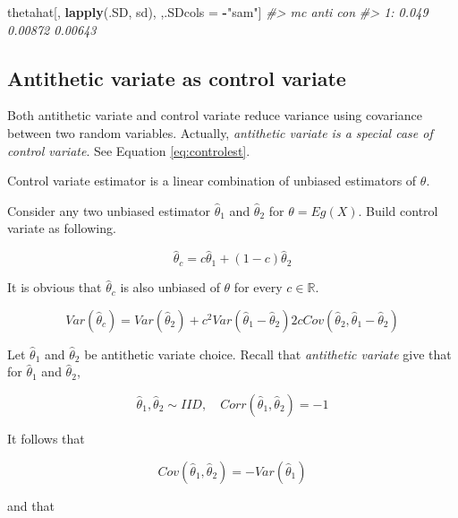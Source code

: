 \documentclass[]{book}
\newenvironment{Shaded}{\begin{snugshade}}{\end{snugshade}}
\newcommand{\CommentTok}[1]{\textcolor[rgb]{0.56,0.35,0.01}{\textit{#1}}}
\newcommand{\KeywordTok}[1]{\textcolor[rgb]{0.13,0.29,0.53}{\textbf{#1}}}
\newcommand{\NormalTok}[1]{#1}
\newcommand{\OperatorTok}[1]{\textcolor[rgb]{0.81,0.36,0.00}{\textbf{#1}}}
\newcommand{\StringTok}[1]{\textcolor[rgb]{0.31,0.60,0.02}{#1}}
\theoremstyle{definition}
\theoremstyle{definition}
\theoremstyle{definition}
\theoremstyle{remark}
\let\BeginKnitrBlock\begin \let\EndKnitrBlock\end
\begin{document}
\begin{Shaded}
\begin{Highlighting}[]
\NormalTok{thetahat[,}
         \KeywordTok{lapply}\NormalTok{(.SD, sd),}
\NormalTok{         ,.SDcols =}\StringTok{ }\OperatorTok{-}\StringTok{"sam"}\NormalTok{]}
\CommentTok{#>       mc    anti     con}
\CommentTok{#> 1: 0.049 0.00872 0.00643}
\end{Highlighting}
\end{Shaded}

\hypertarget{antithetic-variate-as-control-variate}{%
\subsection{Antithetic variate as control variate}\label{antithetic-variate-as-control-variate}}

Both antithetic variate and control variate reduce variance using covariance between two random variables. Actually, \emph{antithetic variate is a special case of control variate}. See Equation \eqref{eq:controlest}.

\BeginKnitrBlock{lemma}
\protect\hypertarget{lem:unnamed-chunk-65}{}{\label{lem:unnamed-chunk-65} }Control variate estimator is a linear combination of unbiased estimators of \(\theta\).
\EndKnitrBlock{lemma}

Consider any two unbiased estimator \(\hat\theta_1\) and \(\hat\theta_2\) for \(\theta = Eg(X)\). Build control variate as following.

\[\hat\theta_c = c\hat\theta_1 + (1 - c)\hat\theta_2\]

It is obvious that \(\hat\theta_c\) is also unbiased of \(\theta\) for every \(c \in \mathbb{R}\).

\begin{equation}
  Var(\hat\theta_c) = Var(\hat\theta_2) + c^2 Var(\hat\theta_1 - \hat\theta_2) 2c Cov(\hat\theta_2, \hat\theta_1 - \hat\theta_2)
  \label{eq:controlvar2}
\end{equation}

Let \(\hat\theta_1\) and \(\hat\theta_2\) be antithetic variate choice. Recall that \emph{antithetic variate} give that for \(\hat\theta_1\) and \(\hat\theta_2\),

\[\hat\theta_1, \hat\theta_2 \sim IID, \quad Corr(\hat\theta_1, \hat\theta_2) = -1\]

It follows that

\[Cov(\hat\theta_1, \hat\theta_2) = - Var(\hat\theta_1)\]

and that
\end{document}
